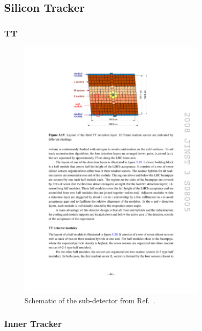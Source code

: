 \subsection{Silicon Tracker}
\subsubsection{TT}

\begin{figure}[!h]
    \centering
    \includegraphics[width=0.8\textwidth]{figs/Detector/tt_layout.pdf}
    \caption{Schematic of the \ttracker sub-detector from Ref.~\cite{Alves:2008zz}.}
    \label{fig:Dec_tt_layout}   
\end{figure}

\subsubsection{Inner Tracker}

